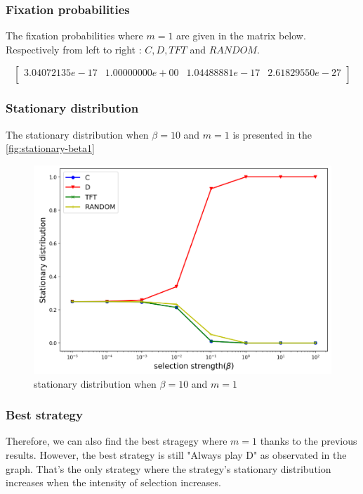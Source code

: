 \documentclass{article}
\begin{document}
\subsubsection{Fixation probabilities} \label{sec:fixprob-m1}

The fixation probabilities where $m=1$ are given in the matrix below. Respectively from left to right : $C, D, TFT$ and $RANDOM$. 

$$
\begin{bmatrix} 
 3.04072135e-17 &  1.00000000e+00  & 1.04488881e-17  & 2.61829550e-27 \\
\end{bmatrix}
$$

\subsubsection{Stationary distribution} \label{sec:statio-m1}

The stationary distribution when $\beta = 10$ and $m=1$ is presented in the \autoref{fig:stationary-beta1}

\begin{figure}[h]
  \centering
  \includegraphics[scale=0.32]{figures/stationary-beta1.png}
  \caption{stationary distribution when $\beta = 10$ and $m=1$}
  \label{fig:stationary-beta1}
\end{figure}

\subsubsection{Best strategy}

Therefore, we can also find the best stragegy where $m=1$ thanks to the previous results. However, the best strategy is still "Always play D" as observated in the graph. That's the only strategy where the strategy's stationary distribution increases when the intensity of selection increases. 
\end{document}
